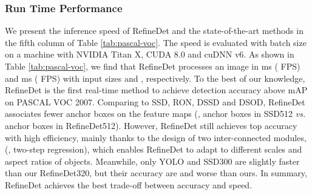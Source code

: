 \documentclass[10pt,twocolumn,letterpaper]{article}
\begin{document}
\subsubsection{Run Time Performance}
We present the inference speed of RefineDet and the state-of-the-art methods in the fifth column of Table \ref{tab:pascal-voc}. The speed is evaluated with batch size  on a machine with NVIDIA Titan X, CUDA 8.0 and cuDNN v6. As shown in Table \ref{tab:pascal-voc}, we find that RefineDet processes an image in ms ( FPS) and ms ( FPS) with input sizes  and , respectively. To the best of our knowledge, RefineDet is the first real-time method to achieve detection accuracy above  mAP on PASCAL VOC 2007. Comparing to SSD, RON, DSSD and DSOD, RefineDet associates fewer anchor boxes on the feature maps (\eg,  anchor boxes in SSD512\cite{DBLP:conf/eccv/LiuAESRFB16} {\it vs.}  anchor boxes in RefineDet512). However, RefineDet still achieves top accuracy with high efficiency, mainly thanks to the design of two inter-connected modules, (\eg, two-step regression), which enables RefineDet to adapt to different scales and aspect ratios of objects. Meanwhile, only YOLO and SSD300 are slightly faster than our RefineDet320, but their accuracy are  and  worse than ours. In summary, RefineDet achieves the best trade-off between accuracy and speed.
\end{document}
